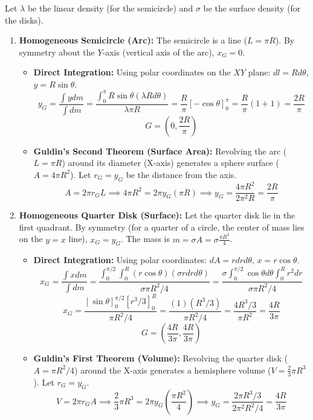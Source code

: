 \documentclass[12pt]{article}
\begin{document}
\begin{correctionbox}
Let $\lambda$ be the linear density (for the semicircle) and $\sigma$ be the surface density (for the disks).
\begin{enumerate}
    \item \textbf{Homogeneous Semicircle (Arc):}
        The semicircle is a line ($L=\pi R$). By symmetry about the $Y$-axis (vertical axis of the arc), $x_G=0$.
        \begin{itemize}
            \item \textbf{Direct Integration:} Using polar coordinates on the $XY$ plane: $dl=R d\theta$, $y=R\sin\theta$.
            $$y_G = \frac{\int y dm}{\int dm} = \frac{\int_0^\pi R\sin\theta (\lambda R d\theta)}{\lambda \pi R} = \frac{R}{\pi} [-\cos\theta]_0^\pi = \frac{R}{\pi} (1+1) = \frac{2R}{\pi}$$
            $$G = \left(0, \frac{2R}{\pi}\right)$$
            \item \textbf{Guldin's Second Theorem (Surface Area):} Revolving the arc ($L=\pi R$) around its diameter (X-axis) generates a sphere surface ($A=4\pi R^2$). Let $r_G = y_G$ be the distance from the axis.
            $$A = 2\pi r_G L \implies 4\pi R^2 = 2\pi y_G (\pi R) \implies y_G = \frac{4\pi R^2}{2\pi^2 R} = \frac{2R}{\pi}$$
        \end{itemize}
    \item \textbf{Homogeneous Quarter Disk (Surface):}
        Let the quarter disk lie in the first quadrant. By symmetry (for a quarter of a circle, the center of mass lies on the $y=x$ line), $x_G=y_G$. The mass is $m=\sigma A = \sigma \frac{\pi R^2}{4}$.
        \begin{itemize}
            \item \textbf{Direct Integration:} Using polar coordinates: $dA = r dr d\theta$, $x=r\cos\theta$.
            $$x_G = \frac{\int x dm}{\int dm} = \frac{\int_0^{\pi/2}\int_0^R (r\cos\theta) (\sigma r dr d\theta)}{\sigma \pi R^2/4} = \frac{\sigma \int_0^{\pi/2}\cos\theta d\theta \int_0^R r^2 dr}{\sigma \pi R^2/4}$$
            $$x_G = \frac{[\sin\theta]_0^{\pi/2} [r^3/3]_0^R}{\pi R^2/4} = \frac{(1) (R^3/3)}{\pi R^2/4} = \frac{4R^3/3}{\pi R^2} = \frac{4R}{3\pi}$$
            $$G = \left(\frac{4R}{3\pi}, \frac{4R}{3\pi}\right)$$
            \item \textbf{Guldin's First Theorem (Volume):} Revolving the quarter disk ($A=\pi R^2/4$) around the X-axis generates a hemisphere volume ($V=\frac{2}{3}\pi R^3$). Let $r_G=y_G$.
            $$V = 2\pi r_G A \implies \frac{2}{3}\pi R^3 = 2\pi y_G \left(\frac{\pi R^2}{4}\right) \implies y_G = \frac{2\pi R^3/3}{2\pi^2 R^2/4} = \frac{4R}{3\pi}$$

\end{itemize}
\end{enumerate}
\end{correctionbox}
\end{document}
